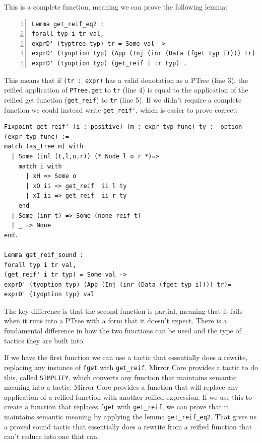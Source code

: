 \documentclass{puthesis}
\begin{document}
This is a complete function, meaning we can prove the following lemma:
\pagebreak
\begin{lstlisting}[numbers=left]
Lemma get_reif_eq2 :
forall typ i tr val,
exprD' (typtree typ) tr = Some val ->
exprD' (tyoption typ) (App (Inj (inr (Data (fget typ i)))) tr)  =
exprD' (tyoption typ) (get_reif i tr typ) .
\end{lstlisting}

This means that if \lstinline|(tr : expr)| has a valid denotation as a
PTree (line 3), the reified application of \lstinline|PTree.get| to
\lstinline|tr| (line 4) is equal to the application of the reified get
function (\lstinline|get_reif|) to \lstinline|tr| (line 5).  If we
didn't require a complete function we could instead write
\lstinline|get_reif'|, which is easier to prove correct:

\begin{lstlisting}
Fixpoint get_reif' (i : positive) (m : expr typ func) ty :  option (expr typ func) :=
match (as_tree m) with
  | Some (inl (t,l,o,r)) (* Node l o r *)=>
    match i with 
      | xH => Some o
      | xO ii => get_reif' ii l ty 
      | xI ii => get_reif' ii r ty 
    end
  | Some (inr t) => Some (none_reif t)
  | _ => None
end.

Lemma get_reif_sound :
forall typ i tr val,
(get_reif' i tr typ) = Some val ->
exprD' (tyoption typ) (App (Inj (inr (Data (fget typ i)))) tr)= 
exprD' (tyoption typ) val
\end{lstlisting}

The key difference is that the second function is partial, meaning
that it fails when it runs into a PTree with a form that it doesn't
expect. There is a fundamental difference in how the two functions can
be used and the type of tactics they are built into.

If we have the first function we can use a tactic that essentially
does a rewrite, replacing any instance of \lstinline|fget| with
\lstinline|get_reif|. Mirror Core provides a tactic to do this, called
\lstinline|SIMPLIFY|, which converts any function that maintains
semantic meaning into a tactic. Mirror Core provides a function that
will replace any application of a reified function with another
reified expression. If we use this to create a function that replaces
\lstinline|fget| with \lstinline|get_reif|, we can prove that it
maintains semantic meaning by applying the lemma
\lstinline|get_reif_eq2|. That gives us a proved sound tactic that
essentially does a rewrite from a reified function that can't reduce
into one that can. 
\end{document}
